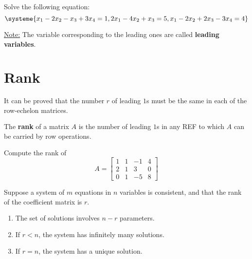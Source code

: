 \documentclass[20pt,a4paper]{extarticle}
\newcounter{example}[section]
\newcounter{theorem}
\newcounter{definition}
\begin{document}
\begin{solution}

\end{solution}

\newpage 

\phantom{2} 

\newpage 

\begin{example}
Solve the following equation:
	\[
		\systeme{x_1 - 2x_2 - x_3 + 3x_4 = 1, 2x_1 - 4x_2 + x_3 = 5, x_1 - 2x_2 + 2x_3 - 3x_4 = 4}
	\]
\end{example}
\begin{solution}

\end{solution}

\newpage 

\phantom{2} 

\vfill 

\underline{Note:} The variable corresponding to the leading ones are called \textbf{leading variables}.

\newpage 

\section{Rank}

It can be proved that the number $r$ of leading $1$s must be the same in each of the row-echelon matrices.

\begin{definition}
The \textbf{rank} of a matrix $A$ is the number of leading $1$s in any REF to which $A$ can be carried by row operations. 
\end{definition}

\vspace*{20pt}

\begin{example}
Compute the rank of 
	\[
		A = \begin{bmatrix} 1 & 1 & -1 & 4 \\ 2 & 1 & 3 & 0 \\ 0 & 1 & -5 & 8 \end{bmatrix}
	\]
\end{example}

\begin{solution}

\end{solution}

\newpage 

\begin{theorem}
Suppose a system of $m$ equations in $n$ variables is consistent, and that the rank of the coefficient matrix is $r$.
	\begin{enumerate}[label=\arabic*.]
	\item The set of solutions involves $n - r$ parameters.
	\item If $r < n$, the system has infinitely many solutions.
	\item If $r = n$, the system has a unique solution.
	\end{enumerate}
\end{theorem}
\end{document}
